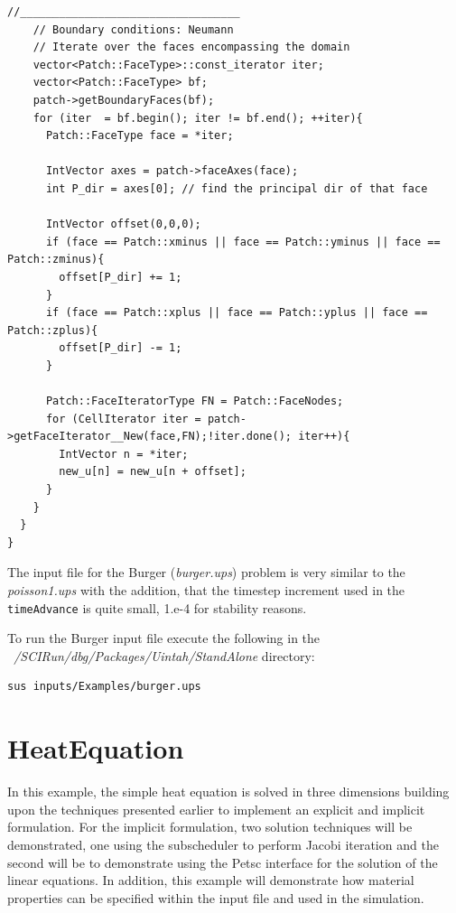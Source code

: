 \documentclass[12pt]{report}
\begin{document}
\begin{Verbatim}[fontsize=\footnotesize]
    //__________________________________
    // Boundary conditions: Neumann
    // Iterate over the faces encompassing the domain
    vector<Patch::FaceType>::const_iterator iter;
    vector<Patch::FaceType> bf;
    patch->getBoundaryFaces(bf);
    for (iter  = bf.begin(); iter != bf.end(); ++iter){
      Patch::FaceType face = *iter;

      IntVector axes = patch->faceAxes(face);
      int P_dir = axes[0]; // find the principal dir of that face

      IntVector offset(0,0,0);
      if (face == Patch::xminus || face == Patch::yminus || face == Patch::zminus){
        offset[P_dir] += 1; 
      }
      if (face == Patch::xplus || face == Patch::yplus || face == Patch::zplus){
        offset[P_dir] -= 1;
      }

      Patch::FaceIteratorType FN = Patch::FaceNodes;
      for (CellIterator iter = patch->getFaceIterator__New(face,FN);!iter.done(); iter++){
        IntVector n = *iter;
        new_u[n] = new_u[n + offset];
      }
    }
  }
}

\end{Verbatim}

The input file for the Burger (\emph{burger.ups}) problem is very
similar to the \emph{poisson1.ups} with the addition, that the
timestep increment used in the \texttt{timeAdvance} is quite small,
1.e-4 for stability reasons.

To run the Burger input file execute the following in the
\emph{~/SCIRun/dbg/Packages/Uintah/StandAlone} directory:

\begin{Verbatim}[fontsize=\footnotesize]
	sus inputs/Examples/burger.ups
\end{Verbatim}

\section{HeatEquation}

In this example, the simple heat equation is solved in three
dimensions building upon the techniques presented earlier to implement
an explicit and implicit formulation.  For the implicit formulation,
two solution techniques will be demonstrated, one using the
subscheduler to perform Jacobi iteration and the second will be to
demonstrate using the Petsc interface for the solution of the linear
equations.  In addition, this example will demonstrate how material
properties can be specified within the input file and used in the
simulation.
\end{document}
